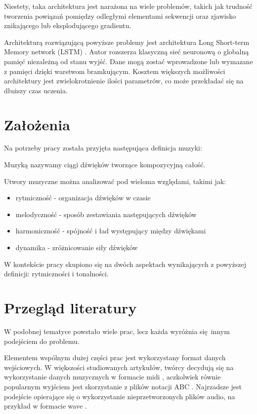 {{    Niestety, taka architektura jest narażona na wiele problemów, takich jak trudność
    tworzenia powiązań pomiędzy odległymi elementami sekwencji oraz zjawisko znikającego lub eksplodującego gradientu.

    Architekturą rozwiązującą powyższe problemy jest architektura
    Long Short-term Memory network (LSTM) \cite{LongShortTermMemory}. 
    Autor rozszerza klasyczną sieć neuronową o globalną pamięć niezależną
    od stanu wyjść. Dane mogą zostać wprowadzone lub wymazane z pamięci dzięki warstwom bramkującym. 
    Kosztem większych możliwości architektury jest zwielokrotnienie 
    ilości parametrów, co może przekładać się na dłuższy czas uczenia.
  }

  \section{Założenia}
  {
    Na potrzeby pracy została przyjęta następująca definicja muzyki:

    Muzyką nazywamy ciągi dźwięków tworzące kompozycyjną całość. 

    Utwory muzyczne można analizować pod wieloma względami, takimi jak:
    \begin{itemize}
        \item rytmiczność - organizacja dźwięków w czasie
        \item melodyczność - sposób zestawiania następujących dźwięków 
        \item harmoniczność - spójność i ład występujący między dźwiękami
        \item dynamika - zróżnicowanie siły dźwięków
    \end{itemize}

    W kontekście pracy skupiono się na dwóch aspektach wynikających z powyższej 
    definicji: rytmiczności i tonalności.
  }

  \section{Przegląd literatury}
  {
    W podobnej tematyce powstało wiele prac, lecz każda wyróżnia 
    się innym podejściem do problemu.

    Elementem wspólnym dużej części prac jest wykorzystany format danych wejściowych.
    W większości studiowanych artykułów, twórcy decydują się na wykorzystanie 
    danych muzycznych w formacie midi \cite{Yang2017MidiNetAC, Hadjeres2016DeepBachAS, Wu2017AHR, Mogren2016CRNNGANCR}, 
    aczkolwiek równie popularnym wyjściem jest skorzystanie z plików notacji ABC \cite{Agarwala2017MusicCU, Sturm2015FolkMS}. 
    Najrzadsze jest podejście opierające się o wykorzystanie nieprzetworzonych plików audio, 
    na przykład w formacie wave \cite{Oord2016WaveNetAG}.
    
}}
